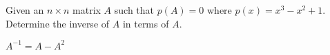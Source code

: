 
\begin{Exercise}[
name={},
title={}, 
difficulty=0,
origin={\cite{YL}}]
Given an $n\times n$ matrix $A$ such that $p(A)=0$ where $p(x)=x^3-x^2+1$.  Determine the inverse of $A$ in terms of $A$.

\end{Exercise}

\begin{Answer}
$A^{-1}=A-A^2$
\end{Answer}
